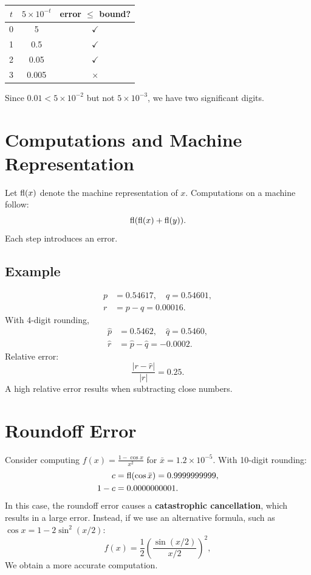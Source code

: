 \begin{center}
  \begin{tabular}{c|c|c}
    $t$ & $5 \times 10^{-t}$ & error $\leq$ bound? \\
    \hline
    0 & 5 & $\checkmark$ \\
    1 & 0.5 & $\checkmark$ \\
    2 & 0.05 & $\checkmark$ \\
    3 & 0.005 & $\times$ \\
  \end{tabular}
\end{center}
Since $0.01 < 5 \times 10^{-2}$ but not $5 \times 10^{-3}$, we have two 
significant digits.

\section{Computations and Machine Representation}

Let $\operatorname{fl}(x)$ denote the machine representation of $x$. Computations on a 
machine follow:
\begin{equation*}
    \operatorname{fl}(\operatorname{fl}(x) + \operatorname{fl}(y)).
\end{equation*}
Each step introduces an error.

\subsection{Example}
\begin{align*}
    p &= 0.54617, \quad q = 0.54601, \\
    r &= p - q = 0.00016.
\end{align*}
With 4-digit rounding,
\begin{align*}
  \hat{p} &= 0.5462, \quad \hat{q} = 0.5460, \\
  \hat{r} &= \hat{p} - \hat{q} = -0.0002.
\end{align*}
Relative error:
\begin{equation*}
  \frac{|r - \hat{r}|}{|r|} = 0.25.
\end{equation*}
A high relative error results when subtracting close numbers.

\section{Roundoff Error} %

Consider computing $\displaystyle f(x) = \frac{1 - \cos x}{x^2}$ for $\bar{x} = 1.2 \times 10^{-5}$.
With 10-digit rounding:
\begin{align*}
    c &= \operatorname{fl}(\cos \bar{x}) = 0.9999999999, \\
    1 - c &= 0.0000000001.
\end{align*}
In this case, the roundoff error causes a \textbf{catastrophic
cancellation}, which 
results in a large error.
Instead, if we use an alternative formula, such as $\cos x = 1 - 2\sin^2(x/2)$:
\begin{equation*}
    f(x) = \frac{1}{2} \left( \frac{\sin(x/2)}{x/2} \right)^2,
\end{equation*}
We obtain a more accurate computation.

